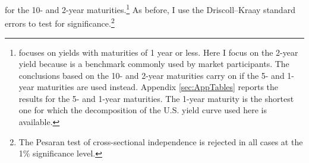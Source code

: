 {for the 10- and 2-year maturities.\footnote{ \cite{Kalemli-Ozcan:2019} focuses on yields with maturities of 1 year or less. Here I focus on the 2-year yield because is a benchmark commonly used by market participants. The conclusions based on the 10- and 2-year maturities carry on if the 5- and 1-year maturities are used instead. Appendix \ref{sec:AppTables} reports the results for the 5- and 1-year maturities. The 1-year maturity is the shortest one for which the decomposition of the U.S. yield curve used here is available.}
As before, I use the Driscoll--Kraay  standard errors to test for significance.\footnote{ The Pesaran test of cross-sectional independence is rejected in all cases at the 1\% significance level.} %


}
